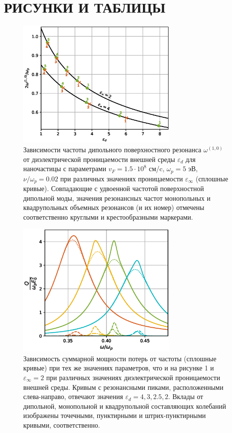 \documentclass[12pt, a4paper]{article}
\def \eps {\varepsilon}
\def \w {\omega}
\begin{document}
\section{РИСУНКИ И ТАБЛИЦЫ}
\begin{figure}[h]
	\centering
	\includegraphics[width=80mm]{./image/fig_w.eps}
	\caption{Зависимости частоты дипольного поверхностного резонанса $\w^{(1,0)}$ от диэлектрической проницаемости внешней среды $\eps_d$ для наночастицы с параметрами $v_F = 1.5 \cdot 10^8$ см/c, $\w_p = 5$ эВ, $\nu / \w_p = 0.02$ при различных значениях проницаемости $\eps_\infty$ (сплошные кривые). Совпадающие с удвоенной частотой поверхностной дипольной моды, значения резонансных частот монопольных и квадрупольных объемных резонансов (и их номер) отмечены соответственно круглыми и крестообразными маркерами.}
	\label{fig_w}
\end{figure} 
\newpage
\begin{figure}[h]
	\centering
	\includegraphics[width=80mm]{./image/fig1_epsd2.eps}
	\caption{Зависимость суммарной мощности потерь от частоты (сплошные кривые) при тех же значениях параметров, что и на рисунке 1 и $\eps_\infty= 2$ при различных значениях диэлектрической проницаемости внешней среды. Кривым с резонансными пиками, расположенными слева-направо, отвечают значения $\eps_d = 4, 3, 2.5, 2$. Вклады от дипольной, монопольной и квадрупольной составляющих колебаний изображены точечными, пунктирными и штрих-пунктирными кривыми, соответственно.}
	\label{fig1_epsd2}
\end{figure} 
\end{document}
